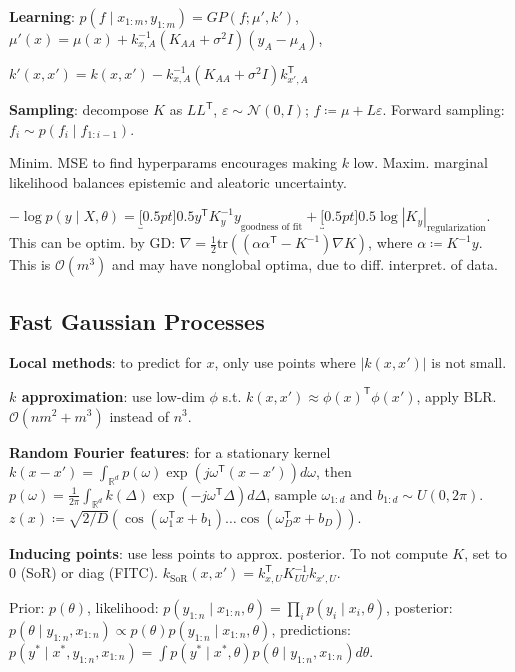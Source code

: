 \documentclass[11pt,landscape,a4paper,fleqn]{article}
\newcommand*{\tran}{^{\mathsf{T}}} %
\begin{document}
\begin{multicols*}{4}
\textbf{Learning}: \(p(f \mid x_{1:m}, y_{1:m}) = GP(f; \mu', k')\),
\(\mu'(x) = \mu(x) + k_{x,A}^{-1}(K_{AA} + \sigma^2 I)(y_A - \mu_A)\),

\(k'(x, x') = k(x, x') - k_{x,A}^{-1}(K_{AA} + \sigma^2 I) k_{x', A}\tran\)

\textbf{Sampling}: decompose \(K\) as \(LL\tran\), \(\varepsilon \sim \mathcal{N}(0, I)\); \(f \coloneqq \mu + L \varepsilon\).
Forward sampling: \(f_i \sim p(f_i \mid f_{1:i - 1})\).

Minim. MSE to find hyperparams encourages making \(k\) low.
Maxim. marginal likelihood balances epistemic and aleatoric uncertainty.

\(- \log p(y \mid X, \theta) = \underbracket[0.5pt]{0.5 y\tran K_y^{-1} y}_{\text{goodness of fit}} + \underbracket[0.5pt]{0.5 \log |K_y|}_{\text{regularization}}\).
This can be optim. by GD:
\(\nabla = \frac{1}{2} \mathrm{tr}((\alpha \alpha\tran - K^{-1}) \nabla K)\),
where \(\alpha \coloneqq K^{-1}y\).
This is \(\mathcal{O}(m^3)\) and may have nonglobal optima, due to diff. interpret. of data.

\subsection{Fast Gaussian Processes}

\textbf{Local methods}: to predict for \(x\), only use points where \(|k(x,x')|\) is not small.

\textbf{\(k\) approximation}: use low-dim \(\phi\) s.t. \(k(x, x') \approx \phi(x)\tran \phi(x')\),
apply BLR. \(\mathcal{O}(nm^2 + m^3)\) instead of \(n^3\).

\textbf{Random Fourier features}: for a stationary kernel \(k(x - x') = \int_{\mathbb{R}^d} p(\omega) \exp(j \omega\tran (x - x')) d\omega\),
then \(p(\omega) = \frac{1}{2\pi} \int_{\mathbb{R}^d} k(\Delta) \exp( - j\omega\tran \Delta) d \Delta\), sample \(\omega_{1:d}\) and \(b_{1:d} \sim U(0, 2\pi)\).
\(z(x) \coloneqq \sqrt{2 / D} (\cos(\omega_1\tran x + b_1) \dots \cos(\omega_D\tran x + b_D))\).

\textbf{Inducing points}: use less points to approx. posterior.
To not compute \(K\), set to \(0\) (SoR) or diag (FITC).
\(k_{\mathrm{SoR}}(x, x') = k_{x, U}\tran K_{UU}^{-1} k_{x', U}\).

Prior: \(p(\theta)\), likelihood: \(p(y_{1:n} \mid x_{1:n}, \theta) = \prod_i p(y_i \mid x_i, \theta)\),
posterior: \(p(\theta \mid y_{1:n}, x_{1:n}) \propto p(\theta) p(y_{1:n} \mid x_{1:n}, \theta)\),
predictions: \(p(y^* \mid x^*, y_{1:n}, x_{1:n}) = \int p(y^* \mid x^*, \theta) p(\theta \mid y_{1:n}, x_{1:n}) d\theta\).


\end{multicols*}
\end{document}
